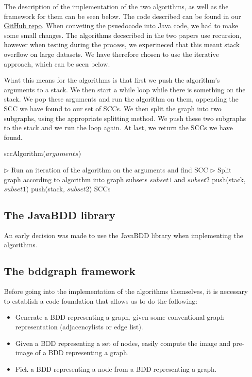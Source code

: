 \documentclass[../master/master.tex]{subfiles}
\begin{document}
The description of the implementation of the two algorithms, as well as the framework for them can be seen below. The code described can be found in our \href{https://github.com/mikaelbdj/bachelor-thesis}{GitHub repo}. When conveting the psuedocode into Java code, we had to make some small changes. The algorithms decscribed in the two papers \cite{lockstep}\cite{linear} use recursion, however when testing during the process, we experineced that this meant stack overflow on large datasets. We have therefore chosen to use the iterative approach, which can be seen below.

What this means for the algorithms is that first we push the algorithm's arguments to a stack. We then start a while loop while there is something on the stack. We pop these arguments and run the algorithm on them, appending the SCC we have found to our set of SCCs. We then split the graph into two subgraphs, using the appropriate splitting method. We push these two subgraphs to the stack and we run the loop again. At last, we return the SCCs we have found.

\begin{algorithm}[H]
  \caption{sccAlgorithm($arguments$)}
  \begin{algorithmic}[1]
    \Statex
    \State \(\triangleright\) Run an iteration of the algorithm on the arguments and find SCC
    \State \(\triangleright\) Split graph according to algorithm into graph subsets $subset1$ and $subset2$
    \State push(stack, $subset1$)
    \State push(stack, $subset2$)
    \EndWhile
    \Statex
    \State \Return SCCs
  \end{algorithmic}
\end{algorithm}

\subsection{The JavaBDD library}
An early decision was made to use the JavaBDD library when implementing the algorithms. \cite{whaley}

\subsection{The bddgraph framework}
Before going into the implementation of the algorithms themselves, it is necessary to establish a code foundation that allows us to do the following:
\begin{itemize}
\item Generate a BDD representing a graph, given some conventional graph representation (adjacencylists or edge list).
\item Given a BDD representing a set of nodes, easily compute the image and pre-image of a BDD representing a graph.
\item Pick a BDD representing a node from a BDD representing a graph.
\end{itemize}
\end{document}
